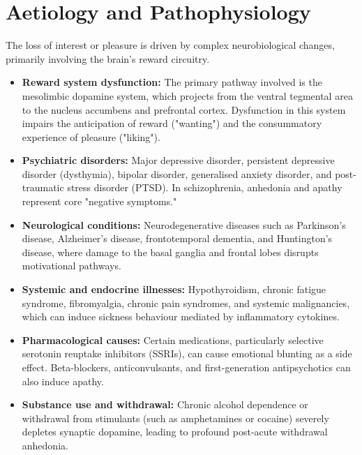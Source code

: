 \section*{Aetiology and Pathophysiology}
The loss of interest or pleasure is driven by complex neurobiological changes, primarily involving the brain's reward circuitry.
\begin{itemize}
    \item \textbf{Reward system dysfunction:} The primary pathway involved is the mesolimbic dopamine system, which projects from the ventral tegmental area to the nucleus accumbens and prefrontal cortex. Dysfunction in this system impairs the anticipation of reward ("wanting") and the consummatory experience of pleasure ("liking").
    \item \textbf{Psychiatric disorders:} Major depressive disorder, persistent depressive disorder (dysthymia), bipolar disorder, generalised anxiety disorder, and post-traumatic stress disorder (PTSD). In schizophrenia, anhedonia and apathy represent core "negative symptoms."
    \item \textbf{Neurological conditions:} Neurodegenerative diseases such as Parkinson's disease, Alzheimer's disease, frontotemporal dementia, and Huntington's disease, where damage to the basal ganglia and frontal lobes disrupts motivational pathways.
    \item \textbf{Systemic and endocrine illnesses:} Hypothyroidism, chronic fatigue syndrome, fibromyalgia, chronic pain syndromes, and systemic malignancies, which can induce sickness behaviour mediated by inflammatory cytokines.
    \item \textbf{Pharmacological causes:} Certain medications, particularly selective serotonin reuptake inhibitors (SSRIs), can cause emotional blunting as a side effect. Beta-blockers, anticonvulsants, and first-generation antipsychotics can also induce apathy.
    \item \textbf{Substance use and withdrawal:} Chronic alcohol dependence or withdrawal from stimulants (such as amphetamines or cocaine) severely depletes synaptic dopamine, leading to profound post-acute withdrawal anhedonia.
\end{itemize}

